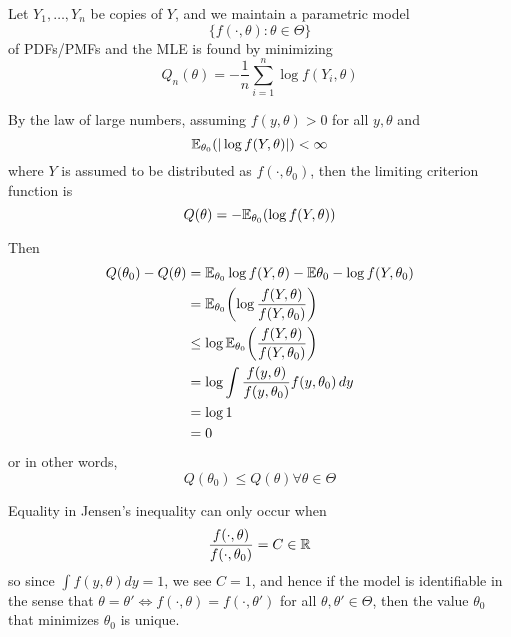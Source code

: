 \begin{exmp}
  \label{defn:parametric_statistical_models:5}
  Let $Y_{1}, \dots, Y_{n}$ be \iid copies of $Y$, and we maintain a
  parametric model
  \begin{equation}
    \label{eq:43}
    \{ f(\cdot, \theta): \theta \in \Theta \}
  \end{equation} of PDFs/PMFs and the MLE is found by minimizing
  \begin{equation}
    \label{eq:44}
    Q_{n}(\theta) = - \frac{1}{n} \sum_{i=1}^{n} \log f(Y_{i}, \theta)
  \end{equation}

  By the law of large numbers, assuming $f(y, \theta) > 0$ for all $y,
  \theta$ and
  \begin{equation}
    \label{eq:45}
    \E{|\log f(Y, \theta)|}{\theta_{0}} < \infty
  \end{equation} where $Y$ is assumed to be distributed as $f(\cdot,
  \theta_{0})$, then the limiting criterion function is
  \begin{equation}
    \label{eq:46}
    Q(\theta) = - \E{\log f(Y, \theta)}{\theta_{0}}
  \end{equation}

  Then
  \begin{align}
    \label{eq:47}
    Q(\theta_{0}) - Q(\theta) &= \mathbb{E}_{\theta_{0}} \log f(Y,
    \theta) - \mathbb{E}{\theta_{0}} - \log f(Y, \theta_{0}) \\
    &= \E{\log \frac{f(Y, \theta)}{f(Y, \theta_{0})}}{\theta_{0}} \\
    &\leq \log \E{\frac{f(Y, \theta)}{f(Y, \theta_{0})}}{\theta_{0}}
  \\
  &= \log \int \frac{f(y, \theta)}{f(y, \theta_{0})} f(y, \theta_{0})
  \, dy \\
  &= \log 1 \\
  &= 0
  \end{align} or in other words,
  \begin{equation}
    \label{eq:48}
    Q(\theta_{0}) \leq Q(\theta) \forall \theta \in \Theta
  \end{equation}
\end{exmp}

Equality in Jensen's inequality can only occur when
\begin{equation}
  \label{eq:49}
  \frac{f(\cdot, \theta)}{f(\cdot, \theta_{0})} = C \in \mathbb{R}
\end{equation} so since $\int f(y, \theta) dy = 1$, we see $C = 1$,
and hence if the model is identifiable in the sense that $\theta =
\theta' \iff f(\cdot, \theta) = f(\cdot, \theta')$ for all $\theta,
\theta' \in \Theta$, then the value $\theta_{0}$ that minimizes
$\theta_{0}$ is unique.


